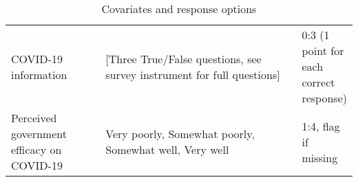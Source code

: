 \begin{table}[H]
\begin{adjustbox}{totalheight=.9\baselineskip, max width = \textwidth}
\begin{tabular}{p{0.3\linewidth}p{0.7\linewidth}p{0.25\linewidth}}
COVID-19 information & [Three True/False questions, see survey instrument for full questions] & 0:3 (1 point for each correct response)\\
Perceived government efficacy   on COVID-19 & Very   poorly, Somewhat poorly, Somewhat well, Very well   & 1:4, flag if missing \\
\end{tabular} 
\end{adjustbox}
\caption{Covariates and response options}
\label{cov_long}
\end{table}